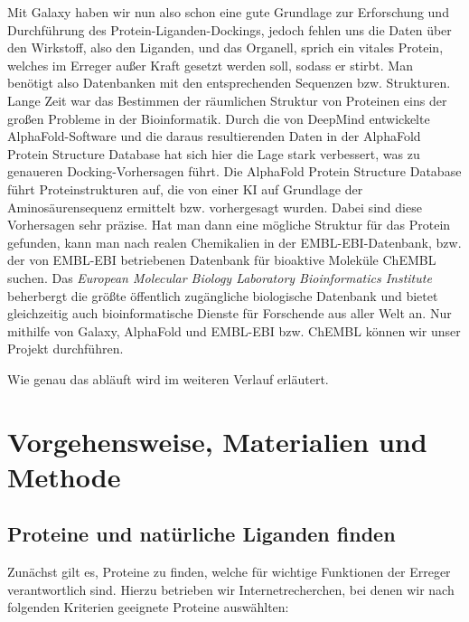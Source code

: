 \documentclass[10pt]{article}
\begin{document}
    Mit Galaxy haben wir nun also schon eine gute Grundlage zur Erforschung und Durchführung des
    Protein-Liganden-Dockings, jedoch fehlen uns die Daten über den Wirkstoff, also den Liganden, und das Organell,
    sprich ein vitales Protein, welches im Erreger außer Kraft gesetzt werden soll, sodass er stirbt. Man benötigt
    also Datenbanken mit den entsprechenden Sequenzen bzw. Strukturen. Lange Zeit war das Bestimmen der räumlichen
    Struktur von Proteinen eins der großen Probleme in der Bioinformatik. Durch die von DeepMind entwickelte
    AlphaFold-Software und die daraus resultierenden Daten in der AlphaFold Protein Structure Database hat sich hier
    die Lage stark verbessert, was zu genaueren Docking-Vorhersagen führt. Die AlphaFold Protein Structure Database
    führt Proteinstrukturen auf, die von einer KI auf Grundlage der Aminosäurensequenz ermittelt bzw. vorhergesagt
    wurden.\cite{13} Dabei sind diese Vorhersagen sehr präzise.
    Hat man dann eine mögliche Struktur für das Protein gefunden,
    kann man nach realen Chemikalien in der EMBL-EBI-Datenbank, bzw. der von EMBL-EBI betriebenen Datenbank für
    bioaktive Moleküle ChEMBL suchen.\cite{7, 9, 10, 30} Das \emph{European Molecular Biology
    Laboratory Bioinformatics Institute}
    beherbergt
    die größte öffentlich zugängliche biologische Datenbank und bietet gleichzeitig auch bioinformatische Dienste für
    Forschende aus aller Welt an. Nur mithilfe von Galaxy, AlphaFold und EMBL-EBI bzw. ChEMBL können wir unser
    Projekt durchführen.

    Wie genau das abläuft wird im weiteren Verlauf erläutert.




    \section{Vorgehensweise, Materialien und Methode}\label{sec:vorgehensweise-materialien-und-methode}

    \subsection{Proteine und natürliche Liganden finden}\label{subsec:proteine-und-natuerliche-liganden-finden}

    Zunächst gilt es, Proteine zu finden, welche für wichtige Funktionen der Erreger verantwortlich sind.
    Hierzu betrieben wir Internetrecherchen, bei denen wir nach folgenden Kriterien geeignete Proteine auswählten:
\end{document}
